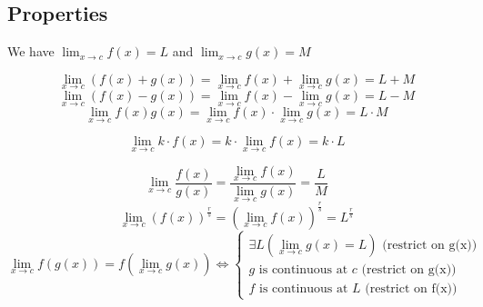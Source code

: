 \documentclass{article}
\begin{document}
\subsection{Properties}

We have \(\lim_{x \to c} f(x) = L\) and \(\lim_{x \to c} g(x) = M\)

\[
\lim_{x \to c} \left(f(x) + g(x)\right) = \lim_{x \to c} f(x) + \lim_{x \to c} g(x) = L + M
\]\[
\lim_{x \to c} \left(f(x) - g(x)\right) = \lim_{x \to c} f(x) - \lim_{x \to c} g(x) = L - M
\]
\[
\lim_{x \to c} f(x)g(x) = \lim_{x \to c} f(x) \cdot \lim_{x \to c} g(x) = L \cdot M
\]

\[
\lim_{x \to c} k \cdot f(x) = k \cdot \lim_{x \to c} f(x) = k \cdot L
\]

\[
\lim_{x \to c} \frac{f(x)}{g(x)} = \frac{\lim_{x \to c} f(x)}{\lim_{x \to c} g(x)} = \frac{L}{M}
\]
\[
  \lim_{x \to c} \left(f(x)\right)^{\frac{r}{s}} = \left(\lim_{x \to c} f(x)\right)^\frac{r}{s} = L^\frac{r}{s}
\]
\[
  \lim_{x \to c} f(g(x)) = f(\lim_{x \to c} g(x)) \iff
  \begin{cases}
    \exists L (\lim_{x \to c} g(x) = L) \text{ (restrict on g(x))}\\
    g \text{ is continuous at }c \text{ (restrict on g(x))} \\
    f \text{ is continuous at }L \text{ (restrict on f(x))}
  \end{cases} 
\]
\end{document}
